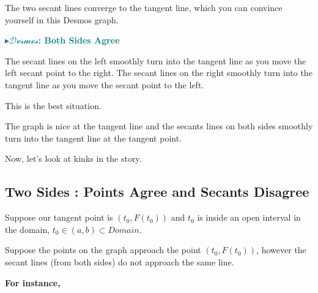 \documentclass{ximera}
\begin{document}
The two secant lines converge to the tangent line, which you can convince yourself in this Desmos graph. 





\begin{onlineOnly}
\textbf{\textcolor{teal}{$\blacktriangleright \mathcal{Desmos}$: Both Sides Agree}} 
\begin{center}
\end{center}
\end{onlineOnly}







The secant lines on the left smoothly turn into the tangent line as you move the left secant point to the right. The secant lines on the right smoothly turn into the tangent line as you move the secant point to the left. 



This is the best situation. 

The graph is nice at the tangent line and the secants lines on both sides smoothly turn into the tangent line at the tangent point. 



Now, let's look at kinks in the story. 





















\subsection*{Two Sides : Points Agree and Secants Disagree}


Suppose our tangent point is $(t_0 , F(t_0))$ and $t_0$ is inside an open interval in the domain, $t_0 \in (a, b) \subset Domain$. 


Suppose the points on the graph approach the point $(t_0 , F(t_0))$, however the secant lines (from both sides) do not approach the same line.



\textbf{For instance,}  
\end{document}
